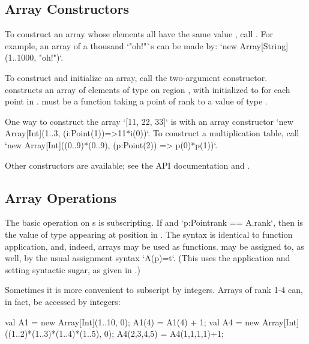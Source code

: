 \subsection{Array Constructors}

To construct an array whose elements all have the same value , call
. 
For example, an array of a thousand \xcd`"oh!"`s can be made by:
\xcd`new Array[String](1..1000, "oh!")`.


To construct and initialize an array, call the two-argument constructor. 
 constructs an array of elements of type  on
region , with  initialized to  for each point
 in .   must be a function taking a point of rank
 to a value of type .  

\begin{ex}
One way to construct the array \xcd`[11, 22, 33]` is with an array constructor
\xcd`new Array[Int](1..3, (i:Point(1))=>11*i(0))`. 
To construct a multiplication table, call
\xcd`new Array[Int]((0..9)*(0..9), (p:Point(2)) => p(0)*p(1))`.
\end{ex}

Other constructors are available; see the API documentation and
. 

\subsection{Array Operations}

The basic operation on s is subscripting.  If  and 
\xcd`p:Point{rank == A.rank}`, then  is the value of type 
appearing at position  in .    The syntax is identical to
function application, and, indeed, arrays may be used as functions.
 may be assigned to, as well, by the usual assignment syntax
\xcd`A(p)=t`.
(This uses the application and setting syntactic sugar, as given in .)

Sometimes it is more convenient to subscript by integers.  Arrays of rank 1-4
can, in fact, be accessed by integers: 
\begin{xten}
val A1 = new Array[Int](1..10, 0);
A1(4) = A1(4) + 1;
val A4 = new Array[Int]((1..2)*(1..3)*(1..4)*(1..5), 0);
A4(2,3,4,5) = A4(1,1,1,1)+1;
\end{xten}



